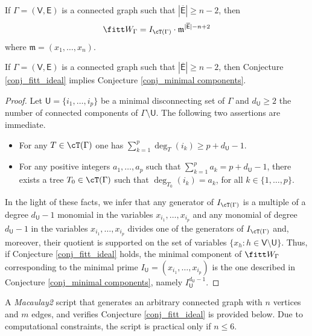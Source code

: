 \documentclass[10pt, leqno]{amsart}
\begin{document}
\begin{conj} \label{conj_fitt_ideal}
If $\Gamma = (\mathsf{V}, \mathsf{E})$ is a connected graph such that $| \overline{\mathsf{E}} | \ge n - 2$, then
\[
\fitt W_\Gamma = I_{\cT(\Gamma)} \cdot \mathfrak{m}^{| \overline{\mathsf{E}} | - n + 2}
\]
where $\mathfrak{m} = (x_1, \ldots, x_n)$.
\end{conj}

\begin{prop} \label{strong_weak_conj}
If $\Gamma = (\mathsf{V}, \mathsf{E})$ is a connected graph such that $| \overline{\mathsf{E}} | \ge n - 2$, then Conjecture \ref{conj_fitt_ideal} implies Conjecture \ref{conj_minimal components}.
\end{prop}

\begin{proof}
Let $\mathsf{U} = \{i_1, \ldots, i_p\}$ be a minimal disconnecting set of $\Gamma$ and $d_{\mathsf{U}} \ge 2$ the number of connected components of $\Gamma \setminus \mathsf{U}$. The following two assertions are immediate.
\begin{itemize}
    \item [(i)] For any $T \in \cT(\Gamma)$ one has $\sum_{k = 1}^p \deg_T(i_k) \ge p + d_{\mathsf{U}} - 1$.
    \item [(ii)] For any positive integers $a_1, \ldots, a_p$ such that $\sum_{k = 1}^p a_k = p + d_{\mathsf{U}} - 1$, there exists a tree $T_0 \in \cT(\Gamma)$ such that $\deg_{T_0}(i_k) = a_k$, for all $k \in \{1, \ldots, p\}$.
\end{itemize}
In the light of these facts, we infer that any generator of $I_{\cT(\Gamma)}$ is a multiple of a degree $d_{\mathsf{U}} - 1$ monomial in the variables $x_{i_1}, \ldots, x_{i_p}$ and any monomial of degree $d_{\mathsf{U}} - 1$ in the variables $x_{i_1}, \ldots, x_{i_p}$ divides one of the generators of $I_{\cT(\Gamma)}$ and, moreover, their quotient is supported on the set of variables $\{x_h : h \in \mathsf{V} \setminus \mathsf{U}\}$. Thus, if Conjecture \ref{conj_fitt_ideal} holds, the minimal component of $\fitt W_\Gamma$ corresponding to the minimal prime $I_{\mathsf{U}} = (x_{i_1}, \ldots, x_{i_p})$ is the one described in Conjecture \ref{conj_minimal components}, namely $I_{\mathsf{U}}^{d_{\mathsf{U}} - 1}$.
\end{proof}

A \emph{Macaulay2} script that generates an arbitrary connected graph with $n$ vertices and $m$ edges, and verifies Conjecture \ref{conj_fitt_ideal} is provided below. Due to computational constraints, the script is practical only if $n \le 6$.
\end{document}

